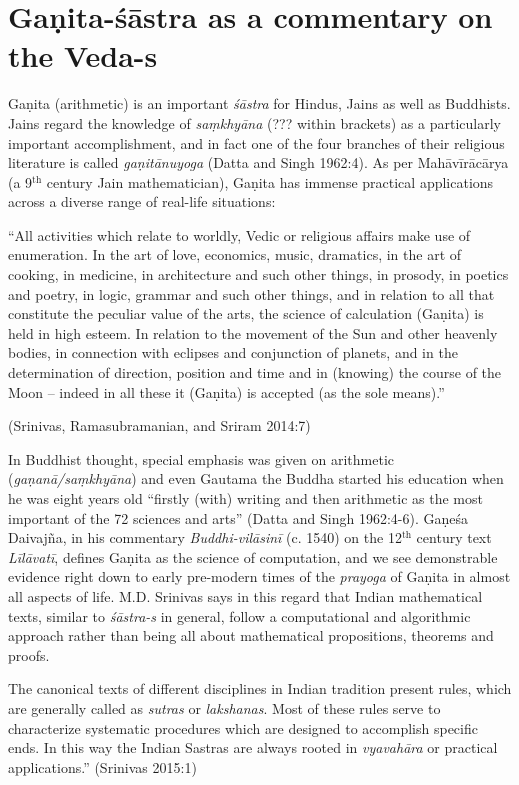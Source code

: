 \section*{Gaṇita-śāstra as a commentary on the Veda-s}

Gaṇita (arithmetic) is an important {\sl śāstra} for Hindus, Jains as well as Buddhists. Jains regard the knowledge of {\sl saṃkhyāna} (??? within brackets) as a particularly important accomplishment, and in fact one of the four branches of their religious literature is called {\sl gaṇitānuyoga} (Datta and Singh 1962:4). As per Mahāvīrācārya (a 9$^{\text{th}}$ century Jain mathematician), Gaṇita has immense practical applications across a diverse range of real-life situations: 
\begin{myquote}
``All activities which relate to worldly, Vedic or religious affairs make use of enumeration. In the art of love, economics, music, dramatics, in the art of cooking, in medicine, in architecture and such other things, in prosody, in poetics and poetry, in logic, grammar and such other things, and in relation to all that constitute the peculiar value of the arts, the science of calculation (Gaṇita) is held in high esteem. In relation to the movement of the Sun and other heavenly bodies, in connection with eclipses and conjunction of planets, and in the determination of direction, position and time and in (knowing) the course of the Moon -- indeed in all these it (Gaṇita) is accepted (as the sole means).''

\hfill (Srinivas, Ramasubramanian, and Sriram 2014:7)
\end{myquote}

In Buddhist thought, special emphasis was given on arithmetic ({\sl gaṇanā/saṃkhyāna}) and even Gautama the Buddha started his education when he was eight years old ``firstly (with) writing and then arithmetic as the most important of the 72 sciences and arts'' (Datta and Singh 1962:4-6). Gaṇeśa Daivajña, in his commentary {\sl Buddhi-vilāsinī} (c. 1540) on the 12$^{\text{th}}$ century text {\sl Līlāvatī}, defines Gaṇita as the science of computation, and we see demonstrable evidence right down to early pre-modern times of the {\sl prayoga} of Gaṇita in almost all aspects of life. M.D. Srinivas says in this regard that Indian mathematical texts, similar to {\sl śāstra-s} in general, follow a computational and algorithmic approach rather than being all about mathematical propositions, theorems and proofs. 
\begin{myquote}
The canonical texts of different disciplines in Indian tradition present rules, which are generally called as {\sl sutras} or {\sl lakshanas}. Most of these rules serve to characterize systematic procedures which are designed to accomplish specific ends. In this way the Indian Sastras are always rooted in {\sl vyavahāra} or practical applications.''
\hfill (Srinivas 2015:1)
\end{myquote}

